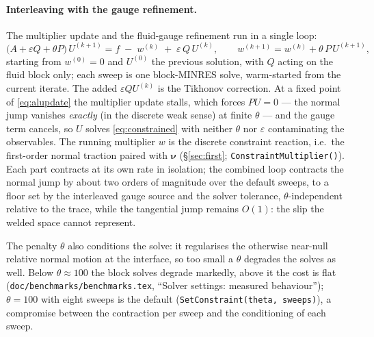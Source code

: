 \documentclass[11pt]{article}
\newcommand{\eps}{\varepsilon}
\newcommand{\bnu}{\bm{\nu}}
\begin{document}
\paragraph{Interleaving with the gauge refinement.} The multiplier
update and the fluid-gauge refinement run in a single loop:
\begin{equation}
  \bigl( A + \eps Q + \theta P \bigr)\, U^{(k+1)}
     = f \;-\; w^{(k)} \;+\; \eps\, Q\, U^{(k)} ,
  \qquad
  w^{(k+1)} = w^{(k)} + \theta\, P\, U^{(k+1)} ,
  \label{eq:alupdate}
\end{equation}
starting from $w^{(0)} = 0$ and $U^{(0)}$ the previous solution, with
$Q$ acting on the fluid block only; each sweep is one block-MINRES solve,
warm-started from the current iterate. The added $\eps QU^{(k)}$ is the
Tikhonov correction. At a fixed point of \eqref{eq:alupdate} the
multiplier update stalls, which forces $P U = 0$ --- the normal jump
vanishes \emph{exactly} (in the discrete weak sense) at finite
$\theta$ --- and the gauge term cancels, so $U$ solves
\eqref{eq:constrained} with neither $\theta$ nor $\eps$ contaminating
the observables. The running multiplier $w$ is the discrete constraint
reaction, i.e.\ the first-order normal traction paired with $\bnu$
(\S\ref{sec:first}; \texttt{ConstraintMultiplier()}). Each part
contracts at its own rate in isolation; the combined loop contracts the
normal jump by about two orders of magnitude over the default sweeps,
to a floor set by the interleaved gauge source and the solver
tolerance, $\theta$-independent relative to the trace, while the
tangential jump remains $O(1)$: the slip the welded space cannot
represent.

The penalty $\theta$ also conditions the solve: it regularises the
otherwise near-null relative normal motion at the interface, so too
small a $\theta$ degrades the solves as well. Below $\theta \approx 100$
the block solves degrade markedly, above it the cost is flat
(\texttt{doc/benchmarks/benchmarks.tex}, ``Solver settings: measured behaviour'');
$\theta = 100$ with eight sweeps is the default
(\texttt{SetConstraint(theta, sweeps)}), a compromise between the
contraction per sweep and the conditioning of each sweep.
\end{document}

